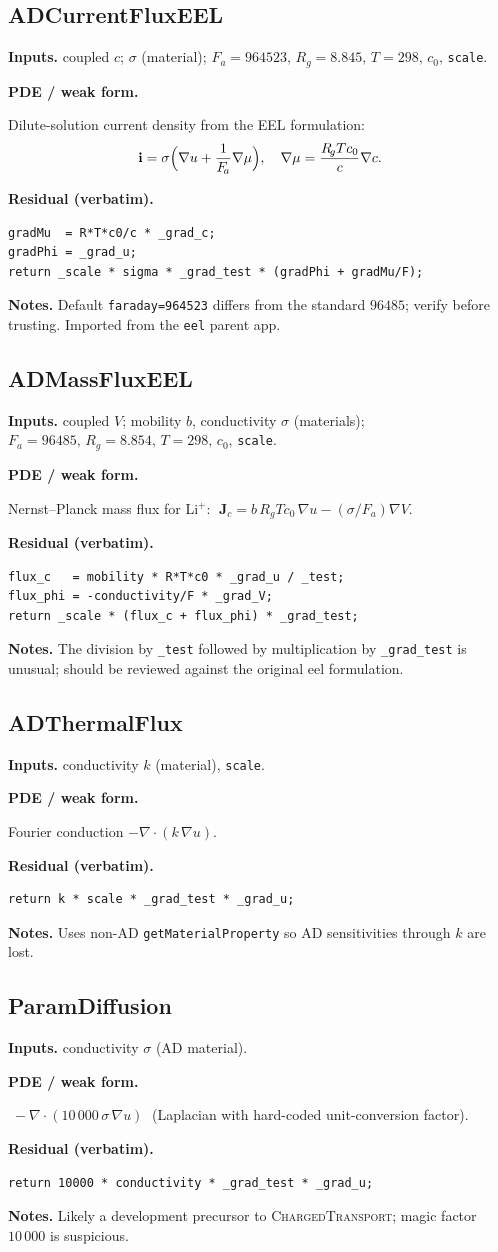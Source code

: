 \documentclass[11pt]{article}
\newcommand{\F}{F_{\!a}}            %
\newcommand{\Rg}{R_{\!g}}           %
\newenvironment{ecmEntry}[1]{%
  \subsection{#1}%
}{}
\newcommand{\inputsRow}[1]{\par\noindent\textbf{Inputs.} #1\par}
\newcommand{\pdeRow}[1]{\par\noindent\textbf{PDE / weak form.}\par #1\par}
\newcommand{\codeRow}{\par\noindent\textbf{Residual (verbatim).}\par}
\newcommand{\notesRow}[1]{\par\noindent\textbf{Notes.} #1\par}
\begin{document}
\begin{ecmEntry}{ADCurrentFluxEEL}
\inputsRow{coupled $c$; $\sigma$ (material); $\F=964523,\,\Rg=8.845,\,T=298,\,c_0,\,$\texttt{scale}.}
\pdeRow{Dilute-solution current density from the EEL formulation:
\[
  \mathbf{i} = \sigma\Bigl(\nabla u + \frac{1}{\F}\nabla\mu\Bigr),\quad
  \nabla\mu = \frac{\Rg T c_0}{c}\nabla c.
\]}
\codeRow\begin{lstlisting}
gradMu  = R*T*c0/c * _grad_c;
gradPhi = _grad_u;
return _scale * sigma * _grad_test * (gradPhi + gradMu/F);
\end{lstlisting}
\notesRow{Default \texttt{faraday=964523} differs from the standard $96485$; verify before
trusting. Imported from the \texttt{eel} parent app.}
\end{ecmEntry}

\begin{ecmEntry}{ADMassFluxEEL}
\inputsRow{coupled $V$; mobility $b$, conductivity $\sigma$ (materials);
$\F=96485,\,\Rg=8.854,\,T=298,\,c_0,\,$\texttt{scale}.}
\pdeRow{Nernst--Planck mass flux for Li$^+$:
$\;\mathbf{J}_c = b\,\Rg T c_0\,\nabla u - (\sigma/\F)\nabla V.$}
\codeRow\begin{lstlisting}
flux_c   = mobility * R*T*c0 * _grad_u / _test;
flux_phi = -conductivity/F * _grad_V;
return _scale * (flux_c + flux_phi) * _grad_test;
\end{lstlisting}
\notesRow{The division by \texttt{\_test} followed by multiplication by \texttt{\_grad\_test}
is unusual; should be reviewed against the original eel formulation.}
\end{ecmEntry}

\begin{ecmEntry}{ADThermalFlux}
\inputsRow{conductivity $k$ (material), \texttt{scale}.}
\pdeRow{Fourier conduction $-\nabla\cdot(k\,\nabla u)$.}
\codeRow\begin{lstlisting}
return k * scale * _grad_test * _grad_u;
\end{lstlisting}
\notesRow{Uses non-AD \texttt{getMaterialProperty} so AD sensitivities through $k$ are lost.}
\end{ecmEntry}

\begin{ecmEntry}{ParamDiffusion}
\inputsRow{conductivity $\sigma$ (AD material).}
\pdeRow{$\;-\nabla\cdot(10\,000\,\sigma\,\nabla u)\;$ (Laplacian with hard-coded
unit-conversion factor).}
\codeRow\begin{lstlisting}
return 10000 * conductivity * _grad_test * _grad_u;
\end{lstlisting}
\notesRow{Likely a development precursor to \textsc{ChargedTransport}; magic factor
$10\,000$ is suspicious.}
\end{ecmEntry}
\end{document}
